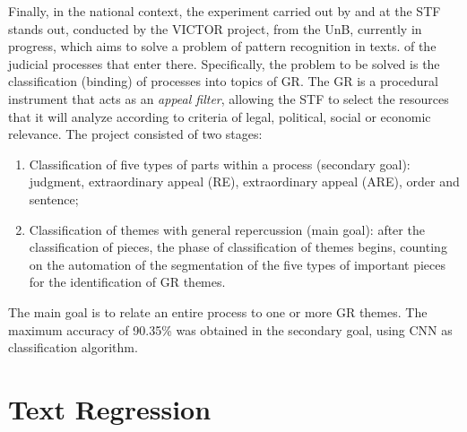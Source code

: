 Finally, in the national context, the experiment carried out by  \textcite{Silva2018} and \textcite{Silva2018Book} at the \gls{STF} stands out, conducted by the VICTOR project, from the \gls{UnB}, currently in progress, which aims to solve a problem of pattern recognition in texts. of the judicial processes that enter there. Specifically, the problem to be solved is the classification (binding) of processes into topics of \gls{GR}. The  \gls{GR} is a procedural instrument that acts as an \textit{appeal filter}, allowing the \gls{STF} to select the resources that it will analyze according to criteria of legal, political, social or economic relevance. The project consisted of two stages:
\begin{enumerate}[noitemsep]
    \item Classification of five types of parts within a process (secondary goal): judgment, extraordinary appeal (RE), extraordinary appeal (ARE), order and sentence;
    \item  Classification of themes with general repercussion (main goal): after the classification of pieces, the phase of classification of themes begins, counting on the automation of the segmentation of the five types of important pieces for the identification of  \gls{GR} themes.
\end{enumerate}
The main goal is to relate an entire process to one or more  \gls{GR} themes. The maximum accuracy of 90.35\% was obtained in the secondary goal, using \gls{CNN} as classification algorithm.



\section{Text Regression}  \label{sec:related_regression}


